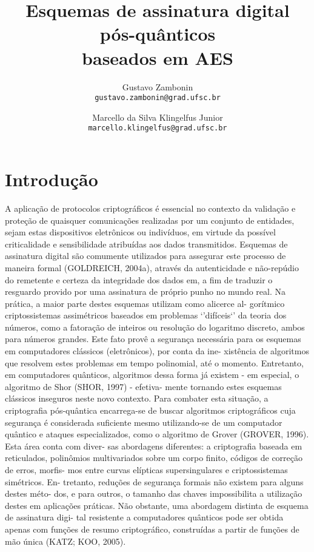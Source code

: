 \documentclass{article}
\title{Esquemas de assinatura digital pós-quânticos \\ baseados em AES}
\author{Gustavo Zambonin \\ \texttt{gustavo.zambonin@grad.ufsc.br} \and Marcello da Silva Klingelfus Junior \\ \texttt{marcello.klingelfus@grad.ufsc.br}}
\date{}
\begin{document}
\maketitle


\section*{Introdução}

A aplicação de protocolos criptográficos é essencial no contexto da
validação e proteção de quaisquer comunicações realizadas por um conjunto
de entidades, sejam estas dispositivos eletrônicos ou indivíduos, em virtude
da possível criticalidade e sensibilidade atribuídas aos dados transmitidos.
Esquemas de assinatura digital são comumente utilizados para assegurar este
processo de maneira formal (GOLDREICH, 2004a), através da autenticidade
e não-repúdio do remetente e certeza da integridade dos dados em, a fim de
traduzir o resguardo provido por uma assinatura de próprio punho no mundo real.
Na prática, a maior parte destes esquemas utilizam como alicerce al-
gorítmico criptossistemas assimétricos baseados em problemas ‘’difíceis‘’ da
teoria dos números, como a fatoração de inteiros ou resolução do logaritmo
discreto, ambos para números grandes. Este fato provê a segurança necessária
para os esquemas em computadores clássicos (eletrônicos), por conta da ine-
xistência de algoritmos que resolvem estes problemas em tempo polinomial,
até o momento.  Entretanto, em computadores quânticos, algoritmos dessa
forma já existem - em especial, o algoritmo de Shor (SHOR, 1997) - efetiva-
mente tornando estes esquemas clássicos inseguros neste novo contexto.
Para combater esta situação, a criptografia pós-quântica encarrega-se
de buscar algoritmos criptográficos cuja segurança é considerada suficiente
mesmo utilizando-se de um computador quântico e ataques especializados,
como o algoritmo de Grover (GROVER, 1996). Esta área conta com diver-
sas abordagens diferentes: a criptografia baseada em reticulados, polinômios
multivariados sobre um corpo finito, códigos de correção de erros, morfis-
mos entre curvas elípticas supersingulares e criptossistemas simétricos. En-
tretanto, reduções de segurança formais não existem para alguns destes méto-
dos, e para outros, o tamanho das chaves impossibilita a utilização destes em
aplicações práticas.
Não obstante, uma abordagem distinta de esquema de assinatura digi-
tal resistente a computadores quânticos pode ser obtida apenas com funções
de resumo criptográfico, construídas a partir de funções de mão única (KATZ;
KOO, 2005). 
\end{document}
